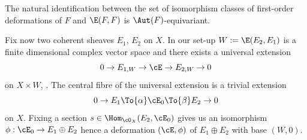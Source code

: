 \begin{lemma}\label{lemma: deformations}
The natural identification between the set of isomorphism classes of first-order deformations of $F$ and $\E(F,F)$ is $\Aut(F)$-equivariant.
\end{lemma}

Fix now two coherent sheaves $E_1$, $E_2$ on $X$. In our set-up $W:=\E(E_2,E_1)$ is a finite dimensional complex vector space and there exists a universal extension\vspace*{-3pt}
\begin{equation}
0\to E_{1,W}\to \cE\to E_{2,W}\to 0
\end{equation}
on $X\times W$,
\cite[Chap.\,7]{LePotier_Lectures}. The central fibre of the universal extension is a trivial extension\vspace*{-5pt}
\begin{equation}
0\to E_{1}\To{\alpha} \cE_0\To{\beta} E_{2}\to 0
\end{equation}
on $X$.
Fixing a section $s\in \Hom_{\cO_X}(E_2,\cE_0)$ gives us an isomorphism $\phi:\cE_0\to E_1\oplus E_2$ hence a deformation $(\cE,\phi)$ of $E_1\oplus E_2$ with base $(W,0)$.

